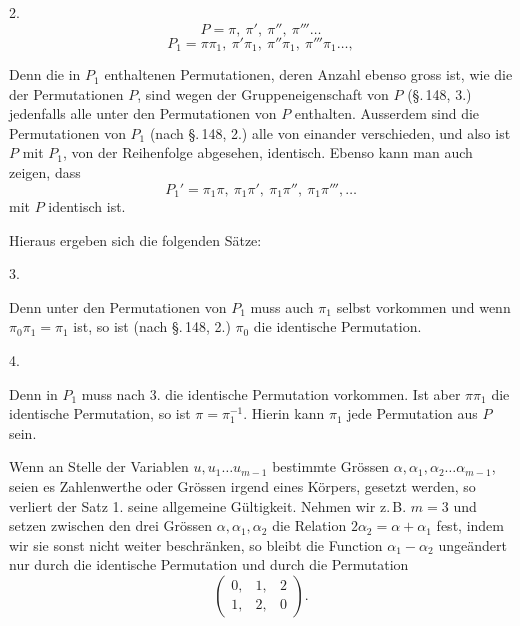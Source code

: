 2. 
\[
P = \pi,\ \pi',\ \pi'',\ \pi''' \ldots
\]
\[
P_1 = \pi\pi_1,\ \pi'\pi_1,\ \pi''\pi_1,\ \pi'''\pi_1 \ldots,
\]

Denn die in $P_1$ enthaltenen Permutationen, deren Anzahl ebenso gross ist, wie die der Permutationen $P$, sind wegen der Gruppeneigenschaft von $P$ (\S.\,148, 3.) jedenfalls alle unter den Permutationen von $P$ enthalten. Ausserdem sind die Permutationen von $P_1$ (nach \S.\,148, 2.) alle von einander verschieden, und also ist $P$ mit $P_1$, von der Reihenfolge abgesehen, identisch. Ebenso kann man auch zeigen, dass
\[
P_1' = \pi_1\pi,\ \pi_1\pi',\ \pi_1\pi'',\ \pi_1\pi''', \ldots
\]
mit $P$ identisch ist.

Hieraus ergeben sich die folgenden Sätze:

3. 

Denn unter den Permutationen von $P_1$ muss auch $\pi_1$ selbst vorkommen und wenn $\pi_0\pi_1 = \pi_1$ ist, so ist (nach \S.\,148, 2.) $\pi_0$ die identische Permutation.

4. 

Denn in $P_1$ muss nach 3. die identische Permutation vorkommen. Ist aber $\pi\pi_1$ die identische Permutation, so ist $\pi = \pi_1^{-1}$. Hierin kann $\pi_1$ jede Permutation aus $P$ sein.

Wenn an Stelle der Variablen $u, u_1 \ldots u_{m-1}$ bestimmte Grössen $\alpha, \alpha_1, \alpha_2 \ldots \alpha_{m-1}$, seien es Zahlenwerthe oder Grössen irgend eines Körpers, gesetzt werden, so verliert der Satz 1. seine allgemeine Gültigkeit. Nehmen wir z.\,B. $m = 3$ und setzen zwischen den drei Grössen $\alpha, \alpha_1, \alpha_2$ die Relation $2\alpha_2 = \alpha + \alpha_1$
fest, indem wir sie sonst nicht weiter beschränken, so bleibt die Function $\alpha_1 - \alpha_2$ ungeändert nur durch die identische Permutation und durch die Permutation
\[
\begin{pmatrix} 0, & 1, & 2 \\ 1, & 2, & 0 \end{pmatrix}.
\]
